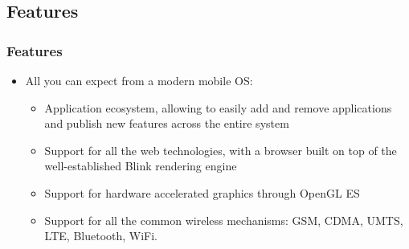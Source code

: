 \subsection{Features}
\begin{frame}
  \frametitle{Features}
  \begin{itemize}
  \item All you can expect from a modern mobile OS:
    \begin{itemize}
    \item Application ecosystem, allowing to easily add and remove
      applications and publish new features across the entire system
    \item Support for all the web technologies, with a browser built
      on top of the well-established Blink rendering engine
    \item Support for hardware accelerated graphics through OpenGL ES
    \item Support for all the common wireless mechanisms: GSM, CDMA,
      UMTS, LTE, Bluetooth, WiFi.
    \end{itemize}
  \end{itemize}
\end{frame}

